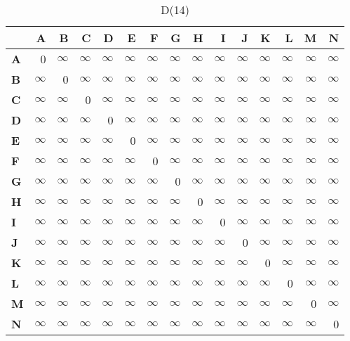 \documentclass{article}
\newcommand{\INF}{$\infty$}
\begin{document}
\begin{table}[H]\centering
\caption{D(14)}
\begin{tabular}{l r r r r r r r r r r r r r r}
\toprule
 & \textbf{A} & \textbf{B} & \textbf{C} & \textbf{D} & \textbf{E} & \textbf{F} & \textbf{G} & \textbf{H} & \textbf{I} & \textbf{J} & \textbf{K} & \textbf{L} & \textbf{M} & \textbf{N}\\\midrule
\textbf{A} & 0 & \INF & \INF & \INF & \INF & \INF & \INF & \INF & \INF & \INF & \INF & \INF & \INF & \INF \\
\textbf{B} & \INF & 0 & \INF & \INF & \INF & \INF & \INF & \INF & \INF & \INF & \INF & \INF & \INF & \INF \\
\textbf{C} & \INF & \INF & 0 & \INF & \INF & \INF & \INF & \INF & \INF & \INF & \INF & \INF & \INF & \INF \\
\textbf{D} & \INF & \INF & \INF & 0 & \INF & \INF & \INF & \INF & \INF & \INF & \INF & \INF & \INF & \INF \\
\textbf{E} & \INF & \INF & \INF & \INF & 0 & \INF & \INF & \INF & \INF & \INF & \INF & \INF & \INF & \INF \\
\textbf{F} & \INF & \INF & \INF & \INF & \INF & 0 & \INF & \INF & \INF & \INF & \INF & \INF & \INF & \INF \\
\textbf{G} & \INF & \INF & \INF & \INF & \INF & \INF & 0 & \INF & \INF & \INF & \INF & \INF & \INF & \INF \\
\textbf{H} & \INF & \INF & \INF & \INF & \INF & \INF & \INF & 0 & \INF & \INF & \INF & \INF & \INF & \INF \\
\textbf{I} & \INF & \INF & \INF & \INF & \INF & \INF & \INF & \INF & 0 & \INF & \INF & \INF & \INF & \INF \\
\textbf{J} & \INF & \INF & \INF & \INF & \INF & \INF & \INF & \INF & \INF & 0 & \INF & \INF & \INF & \INF \\
\textbf{K} & \INF & \INF & \INF & \INF & \INF & \INF & \INF & \INF & \INF & \INF & 0 & \INF & \INF & \INF \\
\textbf{L} & \INF & \INF & \INF & \INF & \INF & \INF & \INF & \INF & \INF & \INF & \INF & 0 & \INF & \INF \\
\textbf{M} & \INF & \INF & \INF & \INF & \INF & \INF & \INF & \INF & \INF & \INF & \INF & \INF & 0 & \INF \\
\textbf{N} & \INF & \INF & \INF & \INF & \INF & \INF & \INF & \INF & \INF & \INF & \INF & \INF & \INF & 0 \\
\bottomrule
\end{tabular}
\end{table}
\end{document}
